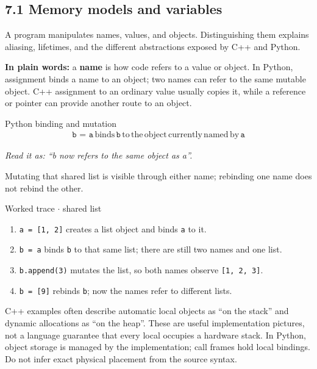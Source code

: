 \documentclass[11pt]{article}
\begin{document}
\begin{keepsection}
\section{7.1 Memory models and variables}

A program manipulates names, values, and objects. Distinguishing them explains aliasing, lifetimes, and the different abstractions exposed by C++ and Python.

\begin{plainbox}\textbf{In plain words:} a \textbf{name} is how code refers to a value or object. In Python, assignment binds a name to an object; two names can refer to the same mutable object. C++ assignment to an ordinary value usually copies it, while a reference or pointer can provide another route to an object.\end{plainbox}

\begin{equationcard}{Python binding and mutation}
\[ \begin{gathered} \texttt{b = a}\, \text{binds}\, \texttt{b}\, \text{to}\, \text{the}\, \text{object}\, \text{currently}\, \text{named}\, \text{by}\, \texttt{a} \end{gathered} \]
{\small \emph{Read it as: “b now refers to the same object as a”.}\par  Mutating that shared list is visible through either name; rebinding one name does not rebind the other.}
\end{equationcard}

\begin{workedbox}{Worked trace \ensuremath{\cdot} shared list}
\begin{enumerate}
\item \texttt{a = [1, 2]} creates a list object and binds \texttt{a} to it.
\item \texttt{b = a} binds \texttt{b} to that same list; there are still two names and one list.
\item \texttt{b.append(3)} mutates the list, so both names observe \texttt{[1, 2, 3]}.
\item \texttt{b = [9]} rebinds \texttt{b}; now the names refer to different lists.
\end{enumerate}
\end{workedbox}

C++ examples often describe automatic local objects as “on the stack” and dynamic allocations as “on the heap”. These are useful implementation pictures, not a language guarantee that every local occupies a hardware stack. In Python, object storage is managed by the implementation; call frames hold local bindings. Do not infer exact physical placement from the source syntax.


\end{keepsection}
\end{document}
